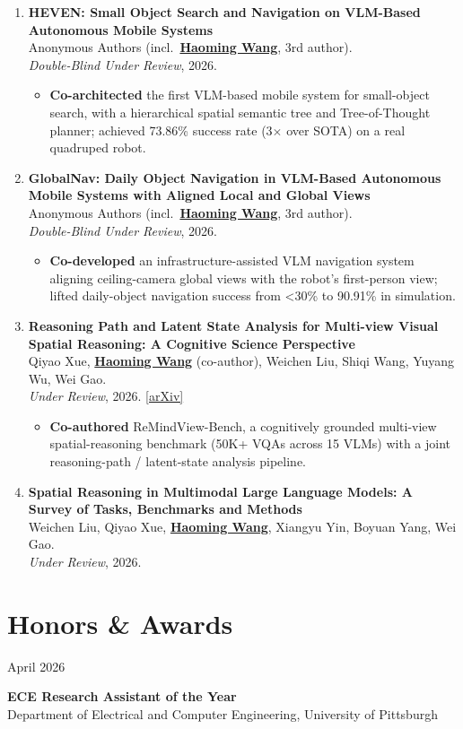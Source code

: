 \documentclass[11pt, letterpaper]{article}
\newenvironment{datedentry}[1]{%
  \par\noindent
  \begin{minipage}[t]{2.8cm}\raggedright\small #1\end{minipage}%
  \hspace{0.3cm}%
  \begin{minipage}[t]{\dimexpr\linewidth-3.1cm\relax}\raggedright
}{\end{minipage}\par\medskip}
\newenvironment{publist}{
  \begin{enumerate}[leftmargin=1.7em, itemsep=4pt, parsep=0pt, topsep=2pt, label=\arabic*.]
}{\end{enumerate}}
\newcommand{\impactbullet}[1]{%
  \par\vspace{1pt}%
  \begin{itemize}[leftmargin=1.2em, topsep=0pt, itemsep=0pt, parsep=0pt, partopsep=0pt]
    \item #1
  \end{itemize}}
\newcommand{\me}{\underline{\textbf{Haoming Wang}}}
\newcommand{\meco}{\underline{\textbf{Haoming Wang}} (co-author)}
\newcommand{\meanon}{\underline{\textbf{Haoming Wang}}}
\begin{document}
\begin{publist}
\item \textbf{HEVEN: Small Object Search and Navigation on VLM-Based Autonomous Mobile Systems}\\
Anonymous Authors (incl.\ \meanon, 3rd author).\\
\textit{Double-Blind Under Review}, 2026.
\impactbullet{\textbf{Co-architected} the first VLM-based mobile system for small-object search, with a hierarchical spatial semantic tree and Tree-of-Thought planner; achieved 73.86\% success rate (3$\times$ over SOTA) on a real quadruped robot.}

\item \textbf{GlobalNav: Daily Object Navigation in VLM-Based Autonomous Mobile Systems with Aligned Local and Global Views}\\
Anonymous Authors (incl.\ \meanon, 3rd author).\\
\textit{Double-Blind Under Review}, 2026.
\impactbullet{\textbf{Co-developed} an infrastructure-assisted VLM navigation system aligning ceiling-camera global views with the robot's first-person view; lifted daily-object navigation success from <30\% to 90.91\% in simulation.}

\item \textbf{Reasoning Path and Latent State Analysis for Multi-view Visual Spatial Reasoning: A Cognitive Science Perspective}\\
Qiyao Xue, \meco, Weichen Liu, Shiqi Wang, Yuyang Wu, Wei Gao.\\
\textit{Under Review}, 2026. \href{https://arxiv.org/abs/2512.02340}{[arXiv]}
\impactbullet{\textbf{Co-authored} ReMindView-Bench, a cognitively grounded multi-view spatial-reasoning benchmark (50K+ VQAs across 15 VLMs) with a joint reasoning-path / latent-state analysis pipeline.}

\item \textbf{Spatial Reasoning in Multimodal Large Language Models: A Survey of Tasks, Benchmarks and Methods}\\
Weichen Liu, Qiyao Xue, \me, Xiangyu Yin, Boyuan Yang, Wei Gao.\\
\textit{Under Review}, 2026.
\end{publist}

\section{Honors \& Awards}

\begin{datedentry}{April 2026}
\textbf{ECE Research Assistant of the Year}\\
Department of Electrical and Computer Engineering, University of Pittsburgh
\end{datedentry}
\end{document}
